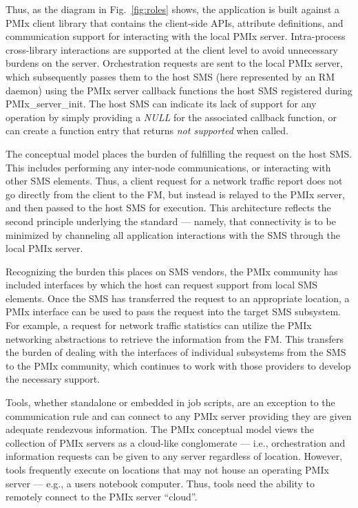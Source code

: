 Thus, as the diagram in Fig.~\ref{fig:roles} shows, the application is built against a \ac{PMIx} client library that contains the client-side \acp{API},
attribute definitions, and communication support for interacting with the local \ac{PMIx} server. Intra-process cross-library interactions
are supported at the client level to avoid unnecessary burdens on the server. Orchestration requests are sent to the
local \ac{PMIx} server, which subsequently passes them to the host \ac{SMS} (here represented by an \ac{RM} daemon) using the \ac{PMIx} server callback functions the host \ac{SMS} registered during PMIx\_server\_init. The host \ac{SMS} can indicate its lack of support for any operation by simply providing a \textit{NULL} for the associated callback function, or can create a function entry that returns \textit{not supported} when called.

The conceptual model places the burden of fulfilling the request on the host \ac{SMS}. This includes performing any
inter-node communications, or interacting with other \ac{SMS} elements. Thus, a client request for a network traffic report
does not go directly from the client to the \ac{FM}, but instead is relayed to the \ac{PMIx} server, and then passed to the host \ac{SMS}
for execution. This architecture reflects the second principle underlying the standard --- namely, that connectivity is to be minimized by channeling all application interactions with the \ac{SMS} through the local \ac{PMIx} server.

Recognizing the burden this places on SMS vendors, the PMIx community has included interfaces by
which the host can request support from local SMS elements. Once the SMS has transferred the request to
an appropriate location, a PMIx interface can be used to pass the request into the target SMS subsystem.
For example, a request for network traffic statistics can utilize the
PMIx networking abstractions to retrieve the information from the FM. This transfers the burden
of dealing with the interfaces of individual subsystems from the SMS to the PMIx community, which continues
to work with those providers to develop the necessary support.

Tools, whether standalone or embedded in job scripts, are an exception to the communication rule and can connect to
any PMIx server providing they are given adequate rendezvous information. The PMIx conceptual model views the
collection of PMIx servers as a cloud-like conglomerate --- i.e., orchestration and information requests can be
given to any server regardless of location. However, tools frequently execute on locations that may not house an
operating PMIx server --- e.g., a users notebook computer. Thus, tools need the ability to remotely connect to
the PMIx server ``cloud''.

